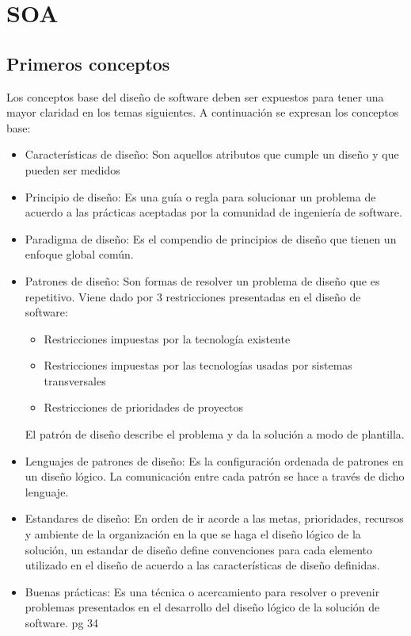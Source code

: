 \section{SOA}
\subsection{Primeros conceptos}

Los conceptos base del diseño de software deben ser expuestos para tener una mayor claridad en los temas siguientes. A continuación se expresan los conceptos base:

\begin{itemize}
  \item Características de diseño: Son aquellos atributos que cumple un diseño y que pueden ser medidos

  \item Principio de diseño: Es una guía o regla para solucionar un problema de acuerdo a las prácticas aceptadas por la comunidad de ingeniería de software.

  \item Paradigma de diseño: Es el compendio de principios de diseño que tienen un enfoque global común.

  \item Patrones de diseño: Son formas de resolver un problema de diseño que es repetitivo. Viene dado por 3 restricciones presentadas en el diseño de software:
  \begin{itemize}
    \item Restricciones impuestas por la tecnología existente
	  \item Restricciones impuestas por las tecnologías usadas por sistemas transversales
	  \item Restricciones de prioridades de proyectos
  \end{itemize}
  El patrón de diseño describe el problema y da la solución a modo de plantilla.

  \item Lenguajes de patrones de diseño: Es la configuración ordenada de patrones en un diseño lógico. La comunicación entre cada patrón se hace a través de dicho lenguaje.

  \item Estandares de diseño: En orden de ir acorde a las metas, prioridades, recursos y ambiente de la organización en la que se haga el diseño lógico de la solución, un estandar de diseño define convenciones para cada elemento utilizado en el diseño de acuerdo a las características de diseño definidas.

  \item Buenas prácticas: Es una técnica o acercamiento para resolver o prevenir problemas presentados en el desarrollo del diseño lógico de la solución de software. pg 34
\end{itemize}

